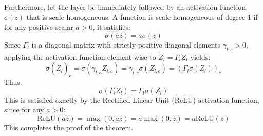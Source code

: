 \documentclass{article}
\theoremstyle{plain}
\theoremstyle{definition}
\theoremstyle{remark}
\begin{document}
Furthermore, let the layer be immediately followed by an activation function $\sigma(z)$ that is scale-homogeneous. A function is scale-homogeneous of degree 1 if for any positive scalar $a > 0$, it satisfies:
$$\sigma(a z) = a \sigma(z)$$
Since $\Gamma_l$ is a diagonal matrix with strictly positive diagonal elements $\gamma_{l,c} > 0$, applying the activation function element-wise to $\widetilde{Z}_l = \Gamma_l Z_l$ yields:
$$\sigma(\widetilde{Z}_l)_c = \sigma\left( \gamma_{l,c} Z_{l,c} \right) = \gamma_{l,c} \sigma\left( Z_{l,c} \right) = \left( \Gamma_l \sigma(Z_l) \right)_c$$
Thus:
$$\sigma\left( \Gamma_l Z_l \right) = \Gamma_l \sigma(Z_l)$$
This is satisfied exactly by the Rectified Linear Unit (ReLU) activation function, since for any $a > 0$:
$$\text{ReLU}(a z) = \max(0, a z) = a \max(0, z) = a \text{ReLU}(z)$$
This completes the proof of the theorem.
\end{document}
